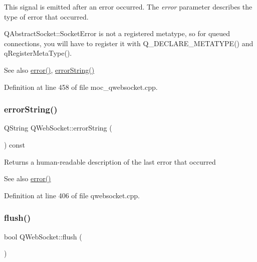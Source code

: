 This signal is emitted after an error occurred. The {\itshape error} parameter describes the type of error that occurred.

Q\+Abstract\+Socket\+::\+Socket\+Error is not a registered metatype, so for queued connections, you will have to register it with Q\+\_\+\+D\+E\+C\+L\+A\+R\+E\+\_\+\+M\+E\+T\+A\+T\+Y\+P\+E() and q\+Register\+Meta\+Type().

\begin{DoxySeeAlso}{See also}
\mbox{\hyperlink{class_q_web_socket_a98e9ba3091c73531678a55982f954dae}{error()}}, \mbox{\hyperlink{class_q_web_socket_aed6ec5ee08cb1d5b3ca4d562cf1cb1b8}{error\+String()}} 
\end{DoxySeeAlso}


Definition at line 458 of file moc\+\_\+qwebsocket.\+cpp.

\mbox{\label{class_q_web_socket_aed6ec5ee08cb1d5b3ca4d562cf1cb1b8}} 
\subsubsection{\texorpdfstring{error\+String()}{errorString()}}
{\footnotesize\ttfamily Q\+String Q\+Web\+Socket\+::error\+String (\begin{DoxyParamCaption}{ }\end{DoxyParamCaption}) const}

Returns a human-\/readable description of the last error that occurred

\begin{DoxySeeAlso}{See also}
\mbox{\hyperlink{class_q_web_socket_a98e9ba3091c73531678a55982f954dae}{error()}} 
\end{DoxySeeAlso}


Definition at line 406 of file qwebsocket.\+cpp.

\mbox{\label{class_q_web_socket_a3d175f62f7db36e2e4ade46b1523efa1}} 
\subsubsection{\texorpdfstring{flush()}{flush()}}
{\footnotesize\ttfamily bool Q\+Web\+Socket\+::flush (\begin{DoxyParamCaption}{ }\end{DoxyParamCaption})}

